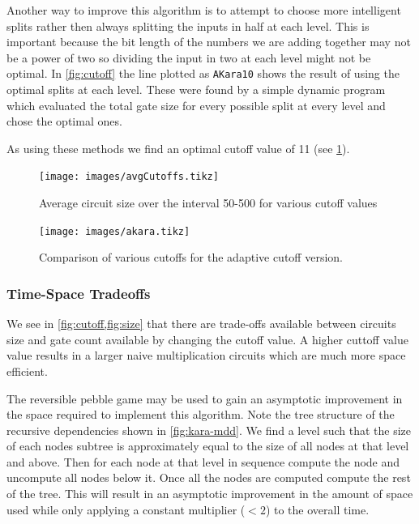       Another way to improve this algorithm is to attempt to choose more intelligent splits rather then always splitting the inputs in half at each level.
      This is important because the bit length of the numbers we are adding together may not be a power of two so dividing the input in two at each level might not be optimal.
      In \cref{fig:cutoff} the line plotted as \verb+AKara10+ shows the result of using the optimal splits at each level.
      These were found by a simple dynamic program which evaluated the total gate size for every possible split at every level and chose the optimal ones.

      As using these methods we find an optimal cutoff value of 11 (see \cref{fig:cutoffs}).
      \begin{figure}[p]
        \capstart
        \texttt{[image: images/avgCutoffs.tikz]}
        \caption{Average circuit size over the interval 50-500 for various cutoff values}
        \label{fig:cutoffs}
      \end{figure}
      \begin{figure}[p]
        \capstart
        \texttt{[image: images/akara.tikz]}
        \caption{Comparison of various cutoffs for the adaptive cutoff version.}
        \label{fig:aKara}
     \end{figure}

\subsubsection{Time-Space Tradeoffs}

We see in \cref{fig:cutoff,fig:size} that there are trade-offs available
between circuits size and gate count available by changing the cutoff
value.  A higher cuttoff value value results in a larger naive
multiplication circuits which are much more space efficient.

The reversible pebble game may be used to gain an asymptotic improvement
in the space required to implement this algorithm. Note the tree structure of
the recursive dependencies shown in \cref{fig:kara-mdd}.  We find a level such
that the size of each nodes subtree is approximately equal to the size of all
nodes at that level and above. Then for each node at that level in sequence
compute the node and uncompute all nodes below it. Once all the nodes are
computed compute the rest of the tree.  This will result in an asymptotic
improvement in the amount of space used while only applying a constant
multiplier ($<2$) to the overall time.


